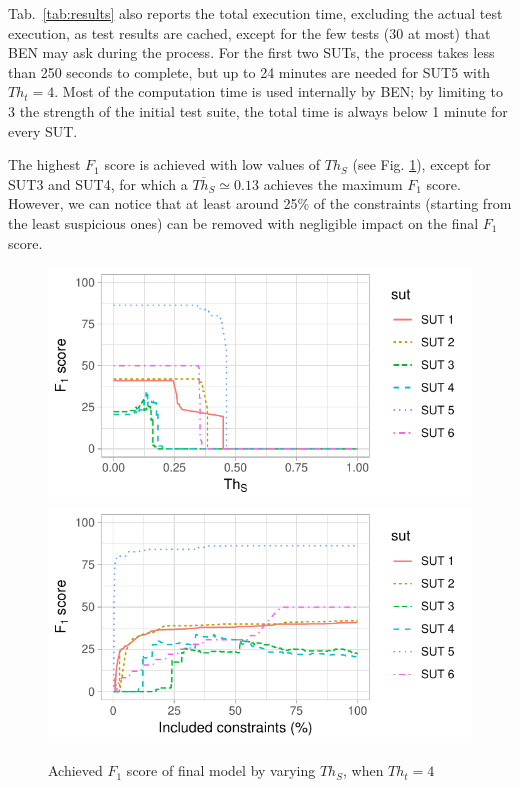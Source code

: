 \begin{tikzborder}{\cite{Gargantini16:validation}}
\begin{tikzborder}{\cite{gargantini_combinatorial_2017}}
\begin{tikzborder}{\cite{garn2019}}
Tab.~\ref{tab:results} also reports the total execution time, excluding the actual test execution, as test results are cached, except for the few tests (30 at most) that BEN may ask during the process.
For the first two SUTs, the process takes less than 250 seconds to complete, but up to 24 minutes are needed for SUT5 with $Th_t=4$. 
Most of the computation time is used internally by BEN; by limiting to 3 the strength of the initial test suite, the total time is always below 1 minute for every SUT. %

The highest $F_1$ score is achieved with low values of $Th_S$ (see Fig. \ref{fig:f1ByThs}), except for SUT3 and SUT4, for which a $\overline{Th_S} \simeq 0.13$ achieves the maximum $F_1$ score. However, we can notice that at least around 25\% of the constraints (starting from the least suspicious ones) can be removed with negligible impact on the final $F_1$ score.\be
\begin{figure}[!hbt]
\centering
\includegraphics[width=.49\textwidth]{SUT_4.pdf}
\includegraphics[width=.49\textwidth]{SUT_4_percConstr.pdf}
\caption{Achieved $F_1$ score of final model by varying $Th_S$, when $Th_t=4$
}\label{fig:f1ByThs}
\end{figure}


\end{tikzborder}
\end{tikzborder}
\end{tikzborder}
